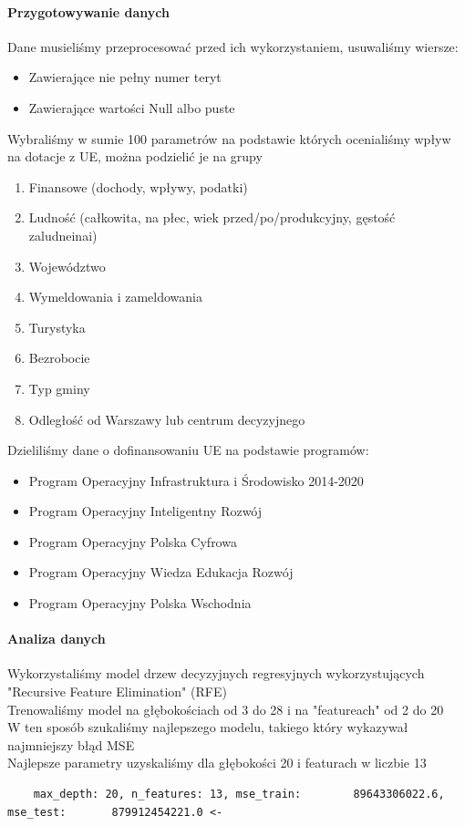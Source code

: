 \documentclass[12pt]{article}
\begin{document}
\paragraph{Przygotowywanie danych}
Dane musieliśmy przeprocesować przed ich wykorzystaniem, usuwaliśmy wiersze:
\begin{itemize}
    \item Zawierające nie pełny numer teryt 
    \item Zawierające wartości Null albo puste 
\end{itemize}
Wybraliśmy w sumie 100 parametrów na podstawie których ocenialiśmy wpływ na dotacje z UE, można podzielić je na grupy
\begin{enumerate}
    \item Finansowe (dochody, wpływy, podatki)
    \item Ludność (całkowita, na płec, wiek przed/po/produkcyjny, gęstość zaludneinai)
    \item Województwo 
    \item Wymeldowania i zameldowania 
    \item Turystyka
    \item Bezrobocie
    \item Typ gminy 
    \item Odległość od Warszawy lub centrum decyzyjnego 
\end{enumerate}
Dzieliliśmy dane o dofinansowaniu UE na podstawie programów:
\begin{itemize}
    \item Program Operacyjny Infrastruktura i Środowisko 2014-2020
    \item Program Operacyjny Inteligentny Rozwój
    \item Program Operacyjny Polska Cyfrowa
    \item Program Operacyjny Wiedza Edukacja Rozwój
    \item Program Operacyjny Polska Wschodnia
\end{itemize}
\paragraph{Analiza danych}
Wykorzystaliśmy model drzew decyzyjnych regresyjnych wykorzystujących "Recursive Feature Elimination" (RFE) \\ 
Trenowaliśmy model na głębokościach od 3 do 28 i na "featureach" od 2 do 20 \\ 
W ten sposób szukaliśmy najlepszego modelu, takiego który wykazywał najmniejszy błąd MSE \\ 
Najlepsze parametry uzyskaliśmy dla głębokości 20 i featurach w liczbie 13
\begin{lstlisting}
    max_depth: 20, n_features: 13, mse_train:        89643306022.6, mse_test:       879912454221.0 <-
\end{lstlisting}
\end{document}
